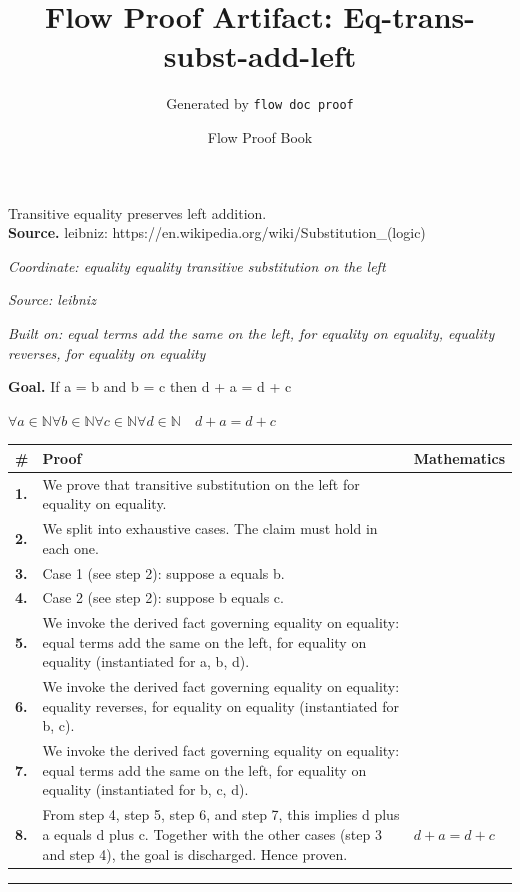 \documentclass[11pt]{article}
\title{Flow Proof Artifact: Eq-trans-subst-add-left}
\author{Generated by \texttt{flow doc proof}}
\date{Flow Proof Book}
\theoremstyle{definition}
\begin{document}
\maketitle
Transitive equality preserves left addition.\\[0.5em]
\textbf{Source.} leibniz: https://en.wikipedia.org/wiki/Substitution\_(logic)\\[0.5em]
\bigskip
{}\par
\smallskip\noindent\textit{Coordinate: equality \cdot equality \cdot transitive substitution on the left}\par
\smallskip\noindent\textit{Source: leibniz}\par
\smallskip\noindent\textit{Built on: equal terms add the same on the left, for equality on equality, equality reverses, for equality on equality}\par
\medskip
\noindent\textbf{Goal.} If a = b and b = c then d + a = d + c\par
\noindent$\displaystyle \forall a \in \mathbb{N} \forall b \in \mathbb{N} \forall c \in \mathbb{N} \forall d \in \mathbb{N}\quad d + a = d + c$\par
\medskip
\noindent
\begin{tabular}{@{} >{\raggedright\arraybackslash}p{} >{\raggedright\arraybackslash}p{} >{\raggedleft\arraybackslash}p{} @{}}
\textbf{\#} & \textbf{Proof} & \textbf{Mathematics} \\
\midrule
\textbf{1.} & We prove that transitive substitution on the left for equality on equality. & \\[0.45em]
\textbf{2.} & We split into exhaustive cases. The claim must hold in each one. & \\[0.45em]
\textbf{3.} & Case 1 (see step 2): suppose a  equals  b. & \\[0.45em]
\textbf{4.} & Case 2 (see step 2): suppose b  equals  c. & \\[0.45em]
\textbf{5.} & We invoke the derived fact governing equality on equality: equal terms add the same on the left, for equality on equality (instantiated for a, b, d). & \\[0.45em]
\textbf{6.} & We invoke the derived fact governing equality on equality: equality reverses, for equality on equality (instantiated for b, c). & \\[0.45em]
\textbf{7.} & We invoke the derived fact governing equality on equality: equal terms add the same on the left, for equality on equality (instantiated for b, c, d). & \\[0.45em]
\textbf{8.} & From step 4, step 5, step 6, and step 7, this implies d plus a equals d plus c. Together with the other cases (step 3 and step 4), the goal is discharged. Hence proven. & $\displaystyle d + a = d + c$ \\[0.45em]
\bottomrule
\end{tabular}
\label{thm:Eq-equality-transitive_substitution_on_the_left}
\par\medskip\hrule
\end{document}
